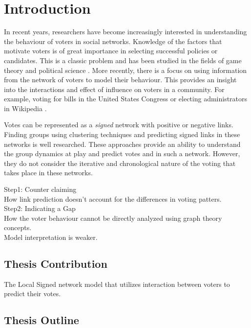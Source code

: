 \chapter{Introduction}



In recent years, researchers have become increasingly interested in understanding the behaviour of voters in social networks. Knowledge of the factors that motivate voters is of great importance in selecting successful policies or candidates. This is a classic problem and has been studied in the fields of game theory and political science \cite{zou2015strategicDoodle,kearns2009behavioral,tal2015a}. More recently, there is a focus on using information from the network of voters to model their behaviour. This provides an insight into the interactions and effect of influence on voters in a community. For example, voting for bills in the United States Congress \cite{karimi2019multicongress} or electing administrators in Wikipedia \cite{jankowski-lorek2013MBSN,cabunducan2011voting,lee2012uncovering}.

Votes can be represented as a \textit{signed} network with positive or negative links. Finding groups using clustering techniques \cite{brito2020aBrazil,levorato2016brazilian,chiang2014prediction} and predicting signed links \cite{leskovec2010predicting,leskovec2010signed,chiang2011exploiting} in these networks is well researched. These approaches provide an ability to understand the group dynamics at play and predict votes and in such a network. However, they do not consider the iterative and chronological nature of the voting that takes place in these networks.



Step1: Counter claiming\\
How link prediction doesn't account for the differences in voting patters.\\

Step2: Indicating a Gap\\
How the voter behaviour cannot be directly analyzed using graph theory concepts.\\
Model interpretation is weaker.\\



\section{Thesis Contribution}
The Local Signed network model that utilizes interaction between voters to predict their votes. 

\section{Thesis Outline}
